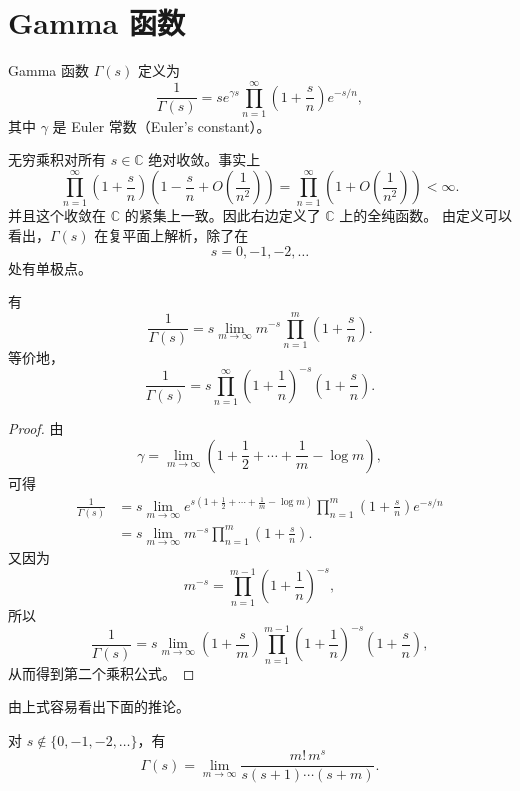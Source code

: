\chapter{Gamma 函数}
\label{chap:gamma-function}

\begin{definition}
	Gamma 函数 $\Gamma(s)$ 定义为
	\[
		\frac{1}{\Gamma(s)}
		=
		s e^{\gamma s}
		\prod_{n=1}^\infty
		\left(1+\frac{s}{n}\right)e^{-s/n},
	\]
	其中 $\gamma$ 是 Euler 常数（Euler's constant）。
\end{definition}

\begin{remark}
	无穷乘积对所有 $s\in\mathbb C$ 绝对收敛。事实上
	\[
		\prod_{n=1}^\infty
		\left(1+\frac{s}{n}\right)
		\left(1-\frac{s}{n}+O\left(\frac{1}{n^2}\right)\right)
		=
		\prod_{n=1}^\infty
		\left(1+O\left(\frac{1}{n^2}\right)\right)<\infty.
	\]
	并且这个收敛在 $\mathbb C$ 的紧集上一致。因此右边定义了 $\mathbb C$ 上的全纯函数。
	由定义可以看出，$\Gamma(s)$ 在复平面上解析，除了在
	\[
		s=0,-1,-2,\ldots
	\]
	处有单极点。
\end{remark}

\begin{theorem}
	有
	\[
		\frac{1}{\Gamma(s)}
		=
		s\lim_{m\to\infty}
		m^{-s}\prod_{n=1}^{m}\left(1+\frac{s}{n}\right).
	\]
	等价地，
	\[
		\frac{1}{\Gamma(s)}
		=
		s\prod_{n=1}^{\infty}
		\left(1+\frac{1}{n}\right)^{-s}
		\left(1+\frac{s}{n}\right).
	\]
\end{theorem}

\begin{proof}
	由
	\[
		\gamma=\lim_{m\to\infty}
		\left(1+\frac12+\cdots+\frac1m-\log m\right),
	\]
	可得
	\[
	\begin{aligned}
		\frac{1}{\Gamma(s)}
		&=
		s\lim_{m\to\infty}
		e^{s(1+\frac12+\cdots+\frac1m-\log m)}
		\prod_{n=1}^{m}
		\left(1+\frac{s}{n}\right)e^{-s/n}  \\
		&=
		s\lim_{m\to\infty}
		m^{-s}\prod_{n=1}^{m}\left(1+\frac{s}{n}\right).
	\end{aligned}
	\]
	又因为
	\[
		m^{-s}
		=
		\prod_{n=1}^{m-1}
		\left(1+\frac1n\right)^{-s},
	\]
	所以
	\[
		\frac{1}{\Gamma(s)}
		=
		s\lim_{m\to\infty}
		\left(1+\frac{s}{m}\right)
		\prod_{n=1}^{m-1}
		\left(1+\frac1n\right)^{-s}
		\left(1+\frac{s}{n}\right),
	\]
	从而得到第二个乘积公式。
\end{proof}

由上式容易看出下面的推论。

\begin{corollary}[原文 Corollary 7.2]
	对 $s\notin\{0,-1,-2,\ldots\}$，有
	\[
		\Gamma(s)
		=
		\lim_{m\to\infty}
		\frac{m!\,m^s}{s(s+1)\cdots(s+m)}.
	\]
\end{corollary}

